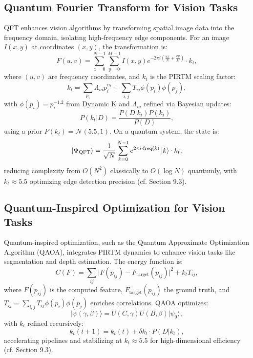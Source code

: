 \documentclass{article}
\theoremstyle{plain}
\begin{document}
\subsection{Quantum Fourier Transform for Vision Tasks}
QFT enhances vision algorithms by transforming spatial image data into the frequency domain, isolating high-frequency edge components. For an image \( I(x, y) \) at coordinates \( (x, y) \), the transformation is:
\begin{equation}
F(u, v) = \sum_{x=0}^{N-1} \sum_{y=0}^{M-1} I(x, y) e^{-2\pi i \left(\frac{ux}{N} + \frac{vy}{M}\right)} \cdot k_t,
\end{equation}
where \( (u, v) \) are frequency coordinates, and \( k_t \) is the PIRTM scaling factor:
\begin{equation}
k_t = \sum_{p_i} \Lambda_m p_i^{\alpha_t} + \sum_{i,j} T_{ij} \phi(p_i) \phi(p_j),
\end{equation}
with \( \phi(p_i) = p_i^{-1.2} \) from Dynamic K and \( \Lambda_m \) refined via Bayesian updates:
\begin{equation}
P(k_t | D) = \frac{P(D | k_t) P(k_t)}{P(D)},
\end{equation}
using a prior \( P(k_t) = \mathcal{N}(5.5, 1) \). On a quantum system, the state is:
\begin{equation}
\ket{\Psi_\text{QFT}} = \frac{1}{\sqrt{N}} \sum_{k=0}^{N-1} e^{2\pi i \cdot \text{freq}(k)} \ket{k} \cdot k_t,
\end{equation}
reducing complexity from \( O(N^2) \) classically to \( O(\log N) \) quantumly, with \( k_t \approx 5.5 \) optimizing edge detection precision (cf. Section 9.3).

\subsection{Quantum-Inspired Optimization for Vision Tasks}
Quantum-inspired optimization, such as the Quantum Approximate Optimization Algorithm (QAOA), integrates PIRTM dynamics to enhance vision tasks like segmentation and depth estimation. The energy function is:
\begin{equation}
C(F) = \sum_{ij} \lvert F(p_{ij}) - F_\text{target}(p_{ij}) \rvert^2 + k_t T_{ij},
\end{equation}
where \( F(p_{ij}) \) is the computed feature, \( F_\text{target}(p_{ij}) \) the ground truth, and \( T_{ij} = \sum_{i,j} T_{ij} \phi(p_i) \phi(p_j) \) enriches correlations. QAOA optimizes:
\begin{equation}
|\psi(\gamma, \beta)\rangle = U(C, \gamma) U(B, \beta) |\psi_0\rangle,
\end{equation}
with \( k_t \) refined recursively:
\begin{equation}
k_t(t+1) = k_t(t) + \delta k_t \cdot P(D | k_t),
\end{equation}
accelerating pipelines and stabilizing at \( k_t \approx 5.5 \) for high-dimensional efficiency (cf. Section 9.3).
\end{document}
